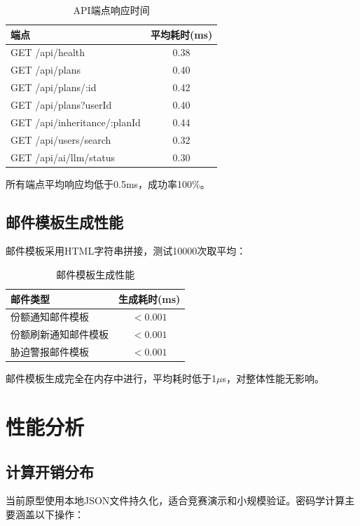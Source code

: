\documentclass[UTF8,a4paper,zihao=-4,openany]{ctexrep}
\begin{document}
\begin{table}[htbp]
\centering
\caption{API端点响应时间}
\label{tab:api_perf}
\begin{tabularx}{\textwidth}{lc}
\toprule
端点 & 平均耗时(ms)\\
\midrule
GET /api/health & 0.38\\
GET /api/plans & 0.40\\
GET /api/plans/:id & 0.42\\
GET /api/plans?userId & 0.40\\
GET /api/inheritance/:planId & 0.44\\
GET /api/users/search & 0.32\\
GET /api/ai/llm/status & 0.30\\
\bottomrule
\end{tabularx}
\end{table}

所有端点平均响应均低于0.5ms，成功率100\%。

\subsection{邮件模板生成性能}

邮件模板采用HTML字符串拼接，测试10000次取平均：

\begin{table}[htbp]
\centering
\caption{邮件模板生成性能}
\label{tab:email_perf}
\begin{tabularx}{\textwidth}{lc}
\toprule
邮件类型 & 生成耗时(ms)\\
\midrule
份额通知邮件模板 & $< 0.001$\\
份额刷新通知邮件模板 & $< 0.001$\\
胁迫警报邮件模板 & $< 0.001$\\
\bottomrule
\end{tabularx}
\end{table}

邮件模板生成完全在内存中进行，平均耗时低于1$\mu$s，对整体性能无影响。

\section{性能分析}

\subsection{计算开销分布}

当前原型使用本地JSON文件持久化，适合竞赛演示和小规模验证。密码学计算主要涵盖以下操作：
\end{document}
